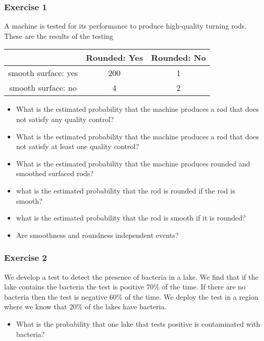 \documentclass[
]{book}
\providecommand{\tightlist}{%
  \setlength{\itemsep}{0pt}\setlength{\parskip}{0pt}}
\begin{document}
\hypertarget{exercise-1-2}{%
\subsubsection{Exercise 1}\label{exercise-1-2}}

A machine is tested for its performance to produce high-quality turning rods. These are the results of the testing

\begin{longtable}[]{@{}ccc@{}}
\toprule
& Rounded: Yes & Rounded: No \\
\midrule
\endhead
smooth surface: yes & 200 & 1 \\
smooth surface: no & 4 & 2 \\
\bottomrule
\end{longtable}

\begin{itemize}
\item
  What is the estimated probability that the machine produces a rod that does not satisfy any quality control?
\item
  What is the estimated probability that the machine produces a rod that does not satisfy at least one quality control?
\item
  What is the estimated probability that the machine produces rounded and smoothed surfaced rods?
\item
  what is the estimated probability that the rod is rounded if the rod is smooth?
\item
  what is the estimated probability that the rod is smooth if it is rounded?
\item
  Are smoothness and roundness independent events?
\end{itemize}

\hypertarget{exercise-2-2}{%
\subsubsection{Exercise 2}\label{exercise-2-2}}

We develop a test to detect the presence of bacteria in a lake. We find that if the lake contains the bacteria the test is positive 70\% of the time. If there are no bacteria then the test is negative 60\% of the time. We deploy the test in a region where we know that 20\% of the lakes have bacteria.

\begin{itemize}
\tightlist
\item
  What is the probability that one lake that tests positive is contaminated with bacteria?
\end{itemize}
\end{document}
